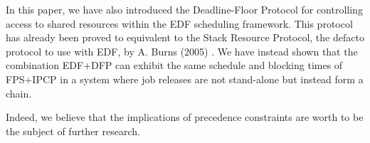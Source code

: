 \documentclass{article}
\begin{document}
In this paper, we have also introduced the Deadline-Floor Protocol for controlling access to shared resources within the EDF scheduling framework. This protocol has already been proved to equivalent to the Stack Resource Protocol, the defacto protocol to use with EDF, by A. Burns (2005) \cite{resource-sharing}. We have instead shown that the combination EDF+DFP can exhibit the same schedule and blocking times of FPS+IPCP in a system where job releases are not stand-alone but instead form a chain.

Indeed, we believe that the implications of precedence constraints are worth to be the subject of further research.


\end{document}
